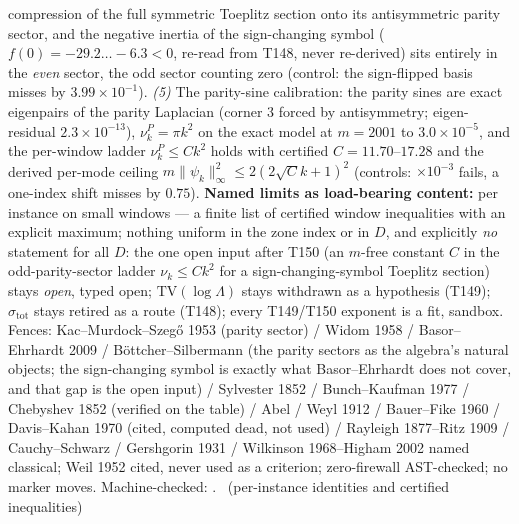 compression of the full symmetric Toeplitz section onto its antisymmetric
parity sector, and the negative inertia of the sign-changing symbol
($f(0)=-29.2\ldots-6.3<0$, re-read from T148, never re-derived) sits
entirely in the \emph{even} sector, the odd sector counting zero (control:
the sign-flipped basis misses by $3.99\times10^{-1}$). \emph{(5)} The
parity-sine calibration: the parity sines are exact eigenpairs of the
parity Laplacian (corner $3$ forced by antisymmetry; eigen-residual
$2.3\times10^{-13}$), $\nu^P_k=\pi k^2$ on the exact model at $m=2001$ to
$3.0\times10^{-5}$, and the per-window ladder $\nu^P_k\le Ck^2$ holds with
certified $C=11.70$--$17.28$ and the derived per-mode ceiling
$m\|\psi_k\|_\infty^2\le2(2\sqrt Ck+1)^2$ (controls: $\times10^{-3}$
fails, a one-index shift misses by $0.75$).
\textbf{Named limits as load-bearing content:} per instance on small windows
--- a finite list of certified window inequalities with an explicit maximum;
nothing uniform in the zone index or in $D$, and explicitly \emph{no}
statement for all $D$: the one open input after T150 (an $m$-free constant
$C$ in the odd-parity-sector ladder $\nu_k\le Ck^2$ for a
sign-changing-symbol Toeplitz section) stays \emph{open}, typed open;
$\mathrm{TV}(\log\Lambda)$ stays withdrawn as a hypothesis (T149);
$\sigma_{\mathrm{tot}}$ stays retired as a route (T148); every T149/T150
exponent is a fit, sandbox. Fences: Kac--Murdock--Szeg\H{o} 1953 (parity
sector) / Widom 1958 / Basor--Ehrhardt 2009 / B\"ottcher--Silbermann (the
parity sectors as the algebra's natural objects; the sign-changing symbol
is exactly what Basor--Ehrhardt does not cover, and that gap is the open
input) / Sylvester 1852 / Bunch--Kaufman 1977 / Chebyshev 1852 (verified on
the table) / Abel / Weyl 1912 / Bauer--Fike 1960 / Davis--Kahan 1970
(cited, computed dead, not used) / Rayleigh 1877--Ritz 1909 /
Cauchy--Schwarz / Gershgorin 1931 / Wilkinson 1968--Higham 2002 named
classical; Weil 1952 cited, never used as a criterion; zero-firewall
AST-checked; no marker moves.
Machine-checked: .
\mE\ (per-instance identities and certified inequalities)


